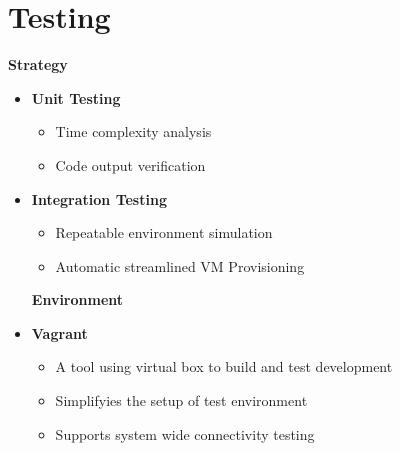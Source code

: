 \section*{\color{NavyBlue}Testing}

\large

\setlength{\columnsep}{2cm}

\begin{multicols}{2}
\begin{center}
\Large{\color{Blue}\textbf{Strategy}}
\end{center}
\vspace{1cm}

\begin{itemize}
\item\Large{\color{Black}\textbf{Unit Testing}}
\large
	\begin{itemize}
        \item Time complexity analysis
        \item Code output verification
	\end{itemize}
\vspace{5cm}
\item\Large{\color{Black}\textbf{Integration Testing}}
\large  
	\begin{itemize}     
	\item Repeatable environment simulation
        \item Automatic streamlined VM Provisioning
	\end{itemize}
\vfill
\columnbreak

\begin{center}
\Large{\color{Blue}\textbf{Environment}}
\end{center}
\vspace{1cm}

\item\Large{\color{Black}\textbf{Vagrant}}
\large
	\begin{itemize}
        \item A tool using virtual box to build and test development
        \item Simplifyies the setup of test environment
        \item Supports system wide connectivity testing
	\end{itemize}

\end{itemize}



\end{multicols}
